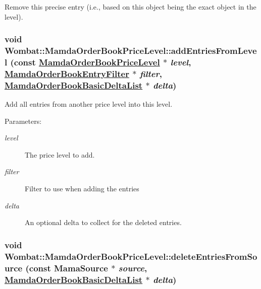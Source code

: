 Remove this precise entry (i.e., based on this object being the exact object in the level). 

\hypertarget{classWombat_1_1MamdaOrderBookPriceLevel_036ea1dce43eea4f932874cd8b8030d9}{
\subsubsection[addEntriesFromLevel]{\setlength{\rightskip}{0pt plus 5cm}void Wombat::Mamda\-Order\-Book\-Price\-Level::add\-Entries\-From\-Level (const \hyperlink{classWombat_1_1MamdaOrderBookPriceLevel}{Mamda\-Order\-Book\-Price\-Level} $\ast$ {\em level}, \hyperlink{classWombat_1_1MamdaOrderBookEntryFilter}{Mamda\-Order\-Book\-Entry\-Filter} $\ast$ {\em filter}, \hyperlink{classWombat_1_1MamdaOrderBookBasicDeltaList}{Mamda\-Order\-Book\-Basic\-Delta\-List} $\ast$ {\em delta})}}
\label{classWombat_1_1MamdaOrderBookPriceLevel_036ea1dce43eea4f932874cd8b8030d9}


Add all entries from another price level into this level. 

\begin{Desc}
\item[Parameters:]
\begin{description}
\item[{\em level}]The price level to add. \item[{\em filter}]Filter to use when adding the entries \item[{\em delta}]An optional delta to collect for the deleted entries. \end{description}
\end{Desc}
\hypertarget{classWombat_1_1MamdaOrderBookPriceLevel_bf63aa01d9802e49874653746b521024}{
\subsubsection[deleteEntriesFromSource]{\setlength{\rightskip}{0pt plus 5cm}void Wombat::Mamda\-Order\-Book\-Price\-Level::delete\-Entries\-From\-Source (const Mama\-Source $\ast$ {\em source}, \hyperlink{classWombat_1_1MamdaOrderBookBasicDeltaList}{Mamda\-Order\-Book\-Basic\-Delta\-List} $\ast$ {\em delta})}}
\label{classWombat_1_1MamdaOrderBookPriceLevel_bf63aa01d9802e49874653746b521024}


